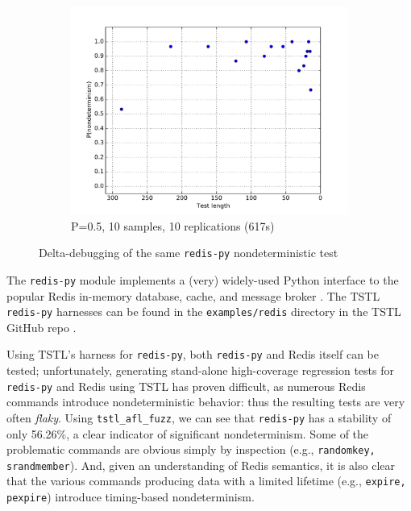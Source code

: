 \begin{figure}
\begin{subfigure}{0.3\columnwidth}
\includegraphics[width=\columnwidth]{redisforceprep}
\caption{P=0.5, 10 samples, 10 replications (617s)}
\label{fig:r3}
\end{subfigure}
\caption{Delta-debugging of the same {\tt redis-py} nondeterministic test}
\end{figure}

The {\tt redis-py} \cite{redispy} module implements a (very) widely-used Python interface
to the popular Redis in-memory database, cache, and
message broker \cite{redis}.  The TSTL {\tt redis-py} harnesses can be found in
the {\tt examples/redis} directory in the TSTL GitHub repo \cite{tstl}.

Using TSTL's harness for {\tt redis-py}, both {\tt redis-py} and Redis
itself can be tested; unfortunately, generating stand-alone
high-coverage regression tests for {\tt redis-py} and Redis using TSTL
has proven difficult, as numerous Redis commands introduce nondeterministic
behavior:  thus the resulting tests are very often \emph{flaky}.   Using {\tt tstl\_afl\_fuzz}, we can see that {\tt redis-py} has a 
stability of only 56.26\%, a clear indicator of significant nondeterminism. Some
of the problematic commands are obvious simply by inspection (e.g.,
{\tt randomkey, srandmember}).  And, given an understanding of Redis
semantics, it is also clear that the various
commands producing data with a limited lifetime (e.g., {\tt expire,
  pexpire}) introduce timing-based nondeterminism.

